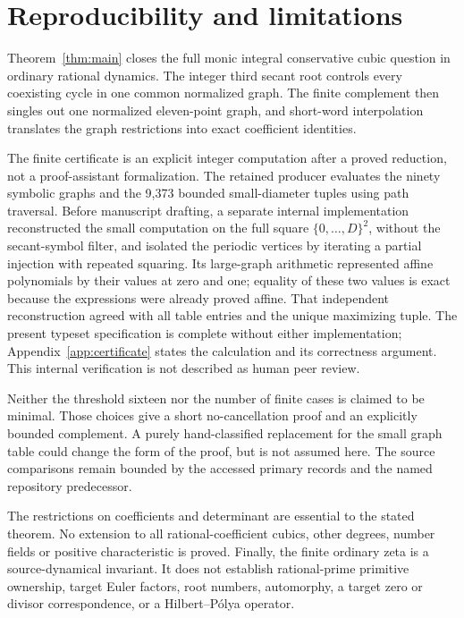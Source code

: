 \section{Reproducibility and limitations}
\label{sec:conclusion}

Theorem~\ref{thm:main} closes the full monic integral conservative
cubic question in ordinary rational dynamics. The integer third
secant root controls every coexisting cycle in one common normalized
graph. The finite complement then singles out one normalized
eleven-point graph, and short-word interpolation translates the
graph restrictions into exact coefficient identities.

The finite certificate is an explicit integer computation after a
proved reduction, not a proof-assistant formalization. The retained
producer evaluates the ninety symbolic graphs and the 9,373 bounded
small-diameter tuples using path traversal. Before manuscript drafting,
a separate internal implementation reconstructed the small computation
on the full square $\{0,\ldots,D\}^2$, without the secant-symbol filter,
and isolated the periodic vertices by iterating a partial injection
with repeated squaring. Its large-graph arithmetic represented affine
polynomials by their values at zero and one; equality of these two
values is exact because the expressions were already proved affine.
That independent reconstruction agreed with all table entries and the
unique maximizing tuple. The present typeset specification is complete
without either implementation; Appendix~\ref{app:certificate}
states the calculation and its correctness argument. This internal
verification is not described as human peer review.

Neither the threshold sixteen nor the number of finite cases is
claimed to be minimal. Those choices give a short no-cancellation
proof and an explicitly bounded complement. A purely hand-classified
replacement for the small graph table could change the form of the
proof, but is not assumed here. The source comparisons remain bounded
by the accessed primary records and the named repository predecessor.

The restrictions on coefficients and determinant are essential to
the stated theorem. No extension to all rational-coefficient cubics,
other degrees, number fields or positive characteristic is proved.
Finally, the finite ordinary zeta is a source-dynamical invariant.
It does not establish rational-prime primitive ownership, target
Euler factors, root numbers, automorphy, a target zero or divisor
correspondence, or a Hilbert--P\'olya operator.
